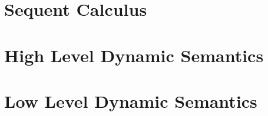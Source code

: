 \chapter{Sequent Calculus}\label{sec:fragment}


\chapter{High Level Dynamic Semantics}\label{sec:hld}


\chapter{Low Level Dynamic Semantics}\label{sec:lld}


